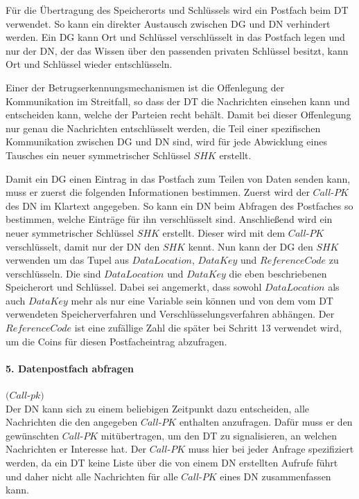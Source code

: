 \documentclass[
	fontsize=11pt,
	headings=small,
	parskip=half,           %
	bibliography=totoc,
	numbers=noenddot,       %
	open=any,               %
]{scrreprt}
\begin{document}
Für die Übertragung des Speicherorts und Schlüssels wird ein Postfach beim DT verwendet. So kann ein direkter Austausch zwischen DG und DN verhindert werden. Ein DG kann Ort und Schlüssel verschlüsselt in das Postfach legen und nur der DN, der das Wissen über den passenden privaten Schlüssel besitzt, kann Ort und Schlüssel wieder entschlüsseln.

Einer der Betrugserkennungsmechanismen ist die Offenlegung der Kommunikation im Streitfall, so dass der DT die Nachrichten einsehen kann und entscheiden kann, welche der Parteien recht behält. Damit bei dieser Offenlegung nur genau die Nachrichten entschlüsselt werden, die Teil einer spezifischen Kommunikation zwischen DG und DN sind, wird für jede Abwicklung eines Tausches ein neuer symmetrischer Schlüssel $SHK$ erstellt.

Damit ein DG einen Eintrag in das Postfach zum Teilen von Daten senden kann, muss er zuerst die folgenden Informationen bestimmen. Zuerst wird der $Call$-$PK$ des DN im Klartext angegeben. So kann ein DN beim Abfragen des Postfaches so bestimmen, welche Einträge für ihn verschlüsselt sind. Anschließend wird ein neuer symmetrischer Schlüssel $SHK$ erstellt. Dieser wird mit dem $Call$-$PK$ verschlüsselt, damit nur der DN den $SHK$ kennt. Nun kann der DG den $SHK$ verwenden um das Tupel aus $DataLocation$, $DataKey$ und $ReferenceCode$ zu verschlüsseln. Die sind $DataLocation$ und $DataKey$ die eben beschriebenen Speicherort und Schlüssel. Dabei sei angemerkt, dass sowohl $DataLocation$ als auch $DataKey$ mehr als nur eine Variable sein können und von dem vom DT verwendeten Speicherverfahren und Verschlüsselungsverfahren abhängen. Der $ReferenceCode$ ist eine zufällige Zahl die später bei Schritt 13 verwendet wird, um die Coins für diesen Postfacheintrag abzufragen.

\paragraph{5. Datenpostfach abfragen} $(Call$-$pk)$\\
Der DN kann sich zu einem beliebigen Zeitpunkt dazu entscheiden, alle Nachrichten die den angegeben $Call$-$PK$ enthalten anzufragen. Dafür muss er den gewünschten $Call$-$PK$ mitübertragen, um den DT zu signalisieren, an welchen Nachrichten er Interesse hat. Der $Call$-$PK$ muss hier bei jeder Anfrage spezifiziert werden, da ein DT keine Liste über die von einem DN erstellten Aufrufe führt und daher nicht alle Nachrichten für alle $Call$-$PK$ eines DN zusammenfassen kann.
\end{document}
